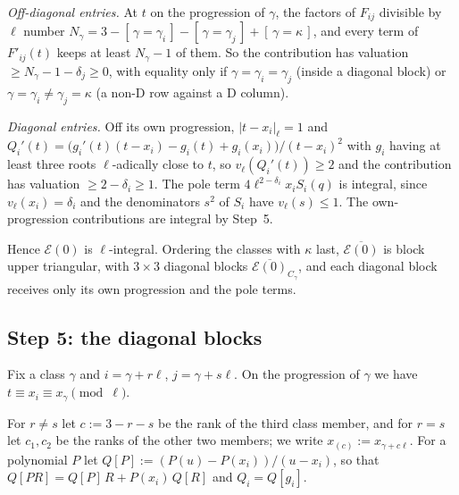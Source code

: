 \documentclass[11pt]{amsart}
\theoremstyle{definition}
\theoremstyle{remark}
\numberwithin{equation}{section}
\newcommand{\ind}[1]{[\,#1\,]}
\begin{document}
\emph{Off-diagonal entries.} At $t$ on the progression of $\gamma$, the factors of $F_{ij}$ divisible by $\ell$ number
$N_\gamma=3-\ind{\gamma=\gamma_i}-\ind{\gamma=\gamma_j}+\ind{\gamma=\kappa}$, and every term of $F'_{ij}(t)$ keeps at least $N_\gamma-1$ of
them. So the contribution has valuation $\ge N_\gamma-1-\delta_j\ge0$, with equality only if $\gamma=\gamma_i=\gamma_j$ (inside a
diagonal block) or $\gamma=\gamma_i\ne\gamma_j=\kappa$ (a non-D row against a D column).

\emph{Diagonal entries.} Off its own progression, $|t-x_i|_\ell=1$ and
$Q_i'(t)=\bigl(g_i'(t)(t-x_i)-g_i(t)+g_i(x_i)\bigr)/(t-x_i)^2$ with $g_i$ having at least three roots $\ell$-adically close to $t$,
so $v_\ell(Q_i'(t))\ge2$ and the contribution has valuation $\ge2-\delta_i\ge1$. The pole term
$4\ell^{2-\delta_i}x_iS_i(q)$ is integral, since $v_\ell(x_i)=\delta_i$ and the denominators $s^2$ of $S_i$ have $v_\ell(s)\le1$.
The own-progression contributions are integral by Step~5.

Hence $\mathcal E(0)$ is $\ell$-integral. Ordering the classes with $\kappa$ last, $\overline{\mathcal E(0)}$ is block upper triangular,
with $3\times3$ diagonal blocks $\overline{\mathcal E(0)}_{C_\gamma}$, and each diagonal block receives only its own progression
and the pole terms.

\subsection{Step 5: the diagonal blocks}
Fix a class $\gamma$ and $i=\gamma+r\ell$, $j=\gamma+s\ell$. On the progression of $\gamma$ we have $t\equiv x_i\equiv x_\gamma\pmod\ell$.

For $r\ne s$ let $c:=3-r-s$ be the rank of the third class member, and for $r=s$ let $c_1,c_2$ be the ranks of the
other two members; we write $x_{(c)}:=x_{\gamma+c\ell}$. For a polynomial $P$ let $Q[P]:=(P(u)-P(x_i))/(u-x_i)$, so that
$Q[PR]=Q[P]\,R+P(x_i)\,Q[R]$ and $Q_i=Q[g_i]$.
\end{document}
